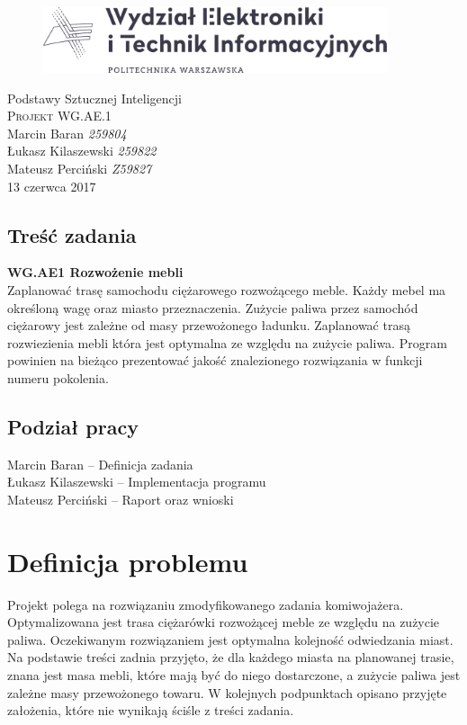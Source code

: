 \documentclass[12pt, oneside, final]{report}
\begin{document}
\begin{titlepage}
	\centering
	\begin{figure}
		\centering
		\includegraphics[width=0.9\textwidth]{logo.pdf}
	\end{figure}
	\vspace*{100pt}
	\LARGE{Podstawy Sztucznej Inteligencji}\\
	\vspace{30pt}
	\textsc{\Huge{Projekt WG.AE.1}}\\
	\vspace{120pt}
	\Large{Marcin Baran \textit{259804}}\\
	\Large{Łukasz Kilaszewski \textit{259822}}\\
	\Large{Mateusz Perciński \textit{Z59827}}\\
	\vfill
	\large{13 czerwca 2017}
\end{titlepage}

\thispagestyle{empty}
\tableofcontents

\section*{Treść zadania}
\textbf{WG.AE1 Rozwożenie mebli} \\
Zaplanować trasę samochodu ciężarowego rozwożącego meble. Każdy mebel ma określoną
wagę oraz miasto przeznaczenia. Zużycie paliwa przez samochód ciężarowy jest zależne od
masy przewożonego ładunku. Zaplanować trasą rozwiezienia mebli która jest optymalna ze
względu na zużycie paliwa. Program powinien na bieżąco prezentować jakość znalezionego
rozwiązania w funkcji numeru pokolenia.
\section*{Podział pracy}
Marcin Baran -- Definicja zadania\\
Łukasz Kilaszewski -- Implementacja programu\\
Mateusz Perciński -- Raport oraz wnioski


\chapter{Definicja problemu}
Projekt polega na rozwiązaniu zmodyfikowanego zadania komiwojażera. Optymalizowana jest trasa ciężarówki rozwożącej meble ze względu na zużycie paliwa. Oczekiwanym rozwiązaniem jest optymalna kolejność odwiedzania miast. Na podstawie treści zadnia przyjęto, że dla każdego miasta na planowanej trasie, znana jest masa mebli, które mają być do niego dostarczone, a zużycie paliwa jest zależne masy przewożonego towaru. W kolejnych podpunktach opisano przyjęte założenia, które nie wynikają ściśle z treści zadania.
\end{document}
